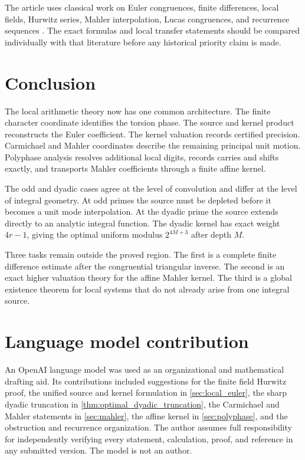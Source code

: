 \documentclass{aomart}
\theoremstyle{definition}
\theoremstyle{remark}
\begin{document}
The article uses classical work on Euler congruences, finite differences, local fields, Hurwitz series, Mahler interpolation, Lucas congruences, and recurrence sequences \cite{CarlitzLevine1960,Young1999,Young2001,Sun2008,Chen2004,Lucas1878a,LidlNiederreiter1997,EverestVanDerPoortenShparlinskiWard2003}. The exact formulas and local transfer statements should be compared individually with that literature before any historical priority claim is made.

\section{Conclusion}\label{sec:conclusion}

The local arithmetic theory now has one common architecture. The finite character coordinate identifies the torsion phase. The source and kernel product reconstructs the Euler coefficient. The kernel valuation records certified precision. Carmichael and Mahler coordinates describe the remaining principal unit motion. Polyphase analysis resolves additional local digits, records carries and shifts exactly, and transports Mahler coefficients through a finite affine kernel.

The odd and dyadic cases agree at the level of convolution and differ at the level of integral geometry. At odd primes the source must be depleted before it becomes a unit mode interpolation. At the dyadic prime the source extends directly to an analytic integral function. The dyadic kernel has exact weight \(4r-1\), giving the optimal uniform modulus \(2^{4M+3}\) after depth \(M\).

Three tasks remain outside the proved region. The first is a complete finite difference estimate after the congruential triangular inverse. The second is an exact higher valuation theory for the affine Mahler kernel. The third is a global existence theorem for local systems that do not already arise from one integral source.
\section*{Language model contribution}

An OpenAI language model was used as an organizational and mathematical drafting aid. Its contributions included suggestions for the finite field Hurwitz proof, the unified source and kernel formulation in \cref{sec:local_euler}, the sharp dyadic truncation in \cref{thm:optimal_dyadic_truncation}, the Carmichael and Mahler statements in \cref{sec:mahler}, the affine kernel in \cref{sec:polyphase}, and the obstruction and recurrence organization. The author assumes full responsibility for independently verifying every statement, calculation, proof, and reference in any submitted version. The model is not an author.



\end{document}

